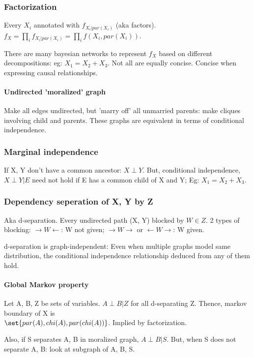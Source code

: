 \documentclass[oneside, article]{memoir}
\begin{document}
\subsubsection{Factorization}
Every $X_i$ annotated with $f_{X_i|par(X_i)}$ (aka factors).\\ $f_X = \prod_{i} f_{X_{i}|par(X_{i})} = \prod_{i} f(X_{i}, par(X_{i}))$.

There are many bayesian networks to represent $f_X$ based on different decompositions: eg: $X_1 = X_2 + X_3$. Not all are equally concise. Concise when expressing causal relationships.

\paragraph*{Undirected 'moralized' graph}
Make all edges undirected, but 'marry off' all unmarried parents: make cliques involving child and parents. These graphs are equivalent in terms of conditional independence.

\subsubsection{Marginal independence}
If X, Y don't have a common ancestor: $X \perp Y$. But, conditional independence, $X \perp Y |E$ need not hold if E has a common child of X and Y; Eg: $X_1 = X_2 + X_3$.

\subsubsection{Dependency seperation of X, Y by Z}
Aka d-separation. Every undirected path (X, Y) blocked by $W\in Z$. 2 types of blocking: $\to W \gets$: W not given;  $\to W \to$ or $\gets W \to$: W given.

d-separation is graph-independent: Even when multiple graphs model same distribution, the conditional independence relationship deduced from any of them hold.

\paragraph*{Global Markov property}
Let A, B, Z be sets of variables. $A \perp B |Z$ for all d-separating Z. Thence, markov boundary of X is \\
$\set{par(A), chi(A), par(chi(A))}$. Implied by factorization.

Also, if S separates A, B in moralized graph, $A \perp B | S$. But, when S does not separate A, B: look at subgraph of A, B, S.
\end{document}
